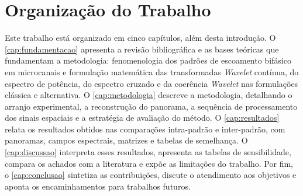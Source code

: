 \section{Organização do Trabalho}

Este trabalho está organizado em cinco capítulos, além desta introdução. O
\autoref{cap:fundamentacao} apresenta a revisão bibliográfica e as bases teóricas que
fundamentam a metodologia: fenomenologia dos padrões de escoamento bifásico em microcanais e
formulação matemática das transformadas \textit{Wavelet} contínua, do espectro de potência, do
espectro cruzado e da coerência \textit{Wavelet} nas formulações clássica e alternativa. O
\autoref{cap:metodologia} descreve a metodologia, detalhando o arranjo experimental, a
reconstrução do panorama, a sequência de processamento dos sinais espaciais e a
estratégia de avaliação do método. O \autoref{cap:resultados} relata os resultados obtidos nas
comparações intra-padrão e inter-padrão, com panoramas, campos espectrais, matrizes e
tabelas de semelhança. O \autoref{cap:discussao} interpreta esses resultados, apresenta
as tabelas de sensibilidade, compara os achados com a literatura e expõe as limitações
do trabalho. Por fim, o \autoref{cap:conclusao} sintetiza as
contribuições, discute o atendimento aos objetivos e aponta os encaminhamentos para trabalhos
futuros.
